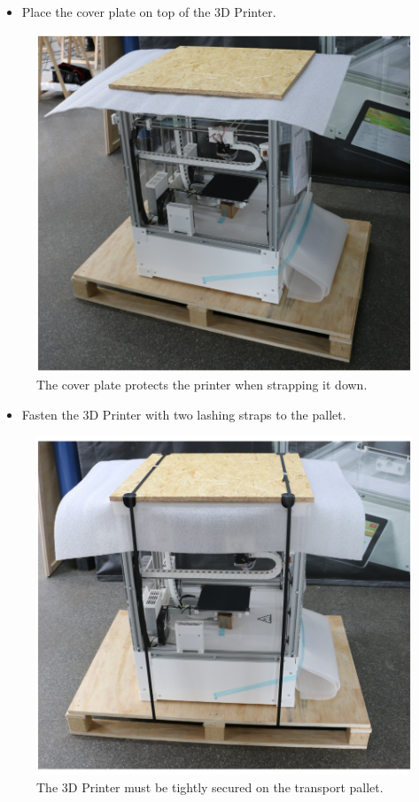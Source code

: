 \begin{itemize}
  \item Place the cover plate on top of the 3D Printer. 
\end{itemize}

\begin{figure}[H]
  \centering
  \includegraphics[width=.7\linewidth]{./img/packstep4.png}
  \caption{The cover plate protects the printer when strapping it down.}
\end{figure}

\begin{itemize}
  \item Fasten the 3D Printer with two lashing straps to the pallet.
\end{itemize}

\begin{figure}[H]
  \centering
  \includegraphics[width=.7\linewidth]{./img/packstep5.png}
  \caption{The 3D Printer must be tightly secured on the transport pallet.}
\end{figure}

